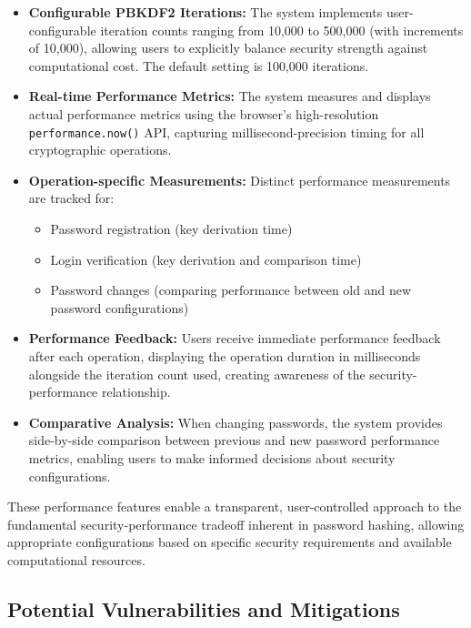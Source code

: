 \documentclass[11pt,a4paper]{article}
\begin{document}
\begin{itemize}
    \item \textbf{Configurable PBKDF2 Iterations:} The system implements user-configurable iteration counts ranging from 10,000 to 500,000 (with increments of 10,000), allowing users to explicitly balance security strength against computational cost. The default setting is 100,000 iterations.
    
    \item \textbf{Real-time Performance Metrics:} The system measures and displays actual performance metrics using the browser's high-resolution \texttt{performance.now()} API, capturing millisecond-precision timing for all cryptographic operations.
    
    \item \textbf{Operation-specific Measurements:} Distinct performance measurements are tracked for:
    \begin{itemize}
        \item Password registration (key derivation time)
        \item Login verification (key derivation and comparison time)
        \item Password changes (comparing performance between old and new password configurations)
    \end{itemize}
    
    \item \textbf{Performance Feedback:} Users receive immediate performance feedback after each operation, displaying the operation duration in milliseconds alongside the iteration count used, creating awareness of the security-performance relationship.
    
    \item \textbf{Comparative Analysis:} When changing passwords, the system provides side-by-side comparison between previous and new password performance metrics, enabling users to make informed decisions about security configurations.
\end{itemize}

These performance features enable a transparent, user-controlled approach to the fundamental security-performance tradeoff inherent in password hashing, allowing appropriate configurations based on specific security requirements and available computational resources.

\subsection{Potential Vulnerabilities and Mitigations}
\end{document}
